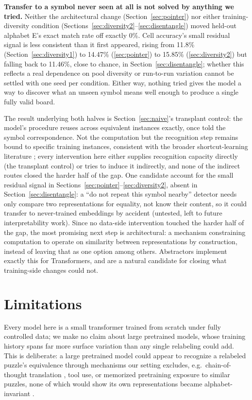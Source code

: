 \documentclass{article} %
\begin{document}
\textbf{Transfer to a symbol never seen at all is not solved by anything
we tried.} Neither the architectural change (Section~\ref{sec:pointer})
nor either training-diversity condition
(Sections~\ref{sec:diversity2}--\ref{sec:disentangle}) moved held-out
alphabet E's exact match rate off exactly 0\%. Cell accuracy's small
residual signal is less consistent than it first appeared, rising from
11.8\% (Section~\ref{sec:diversity1}) to 14.47\% (\ref{sec:pointer}) to
15.85\% (\ref{sec:diversity2}) but falling back to 11.46\%, close to
chance, in Section~\ref{sec:disentangle}; whether this reflects a real
dependence on pool diversity or run-to-run variation cannot be settled
with one seed per condition. Either way, nothing tried gives the model a
way to discover what an unseen symbol means well enough to produce a
single fully valid board.

The result underlying both halves is Section~\ref{sec:naive}'s
transplant control: the model's procedure reuses across equivalent
instances exactly, once told the symbol correspondence. Not the
computation but the recognition step remains bound to specific training
instances, consistent with the broader shortcut-learning literature
\citep{geirhos2020shortcut}; every intervention here either supplies
recognition capacity directly (the transplant control) or tries to
induce it indirectly, and none of the indirect routes closed the harder
half of the gap. One candidate account for the small residual signal in
Sections~\ref{sec:pointer}--\ref{sec:diversity2}, absent in
Section~\ref{sec:disentangle}: a ``do not repeat this symbol nearby''
detector needs only compare two representations for equality, not know
their content, so it could transfer to never-trained embeddings by
accident (untested, left to future interpretability work). Since no
data-side intervention touched the harder half of the gap, the most
promising next step is architectural: a mechanism constraining
computation to operate on similarity between representations by
construction, instead of leaving that as one option among others.
Abstractors \citep{altabaa2024abstractors} implement exactly this for
Transformers, and are a natural candidate for closing what training-side
changes could not.

\section{Limitations}
\label{sec:limitations}

Every model here is a small transformer trained from scratch under fully
controlled data; we make no claim about large pretrained models, whose
training history spans far more surface variation than any single
relabeling could add. This is deliberate: a large pretrained model could
appear to recognize a relabeled puzzle's equivalence through mechanisms
our setting excludes, e.g.\ chain-of-thought translation
\citep{wei2022chain}, tool use, or memorized pretraining exposure to
similar puzzles, none of which would show its own representations became
alphabet-invariant \citep{yang2025emergent}.
\end{document}
